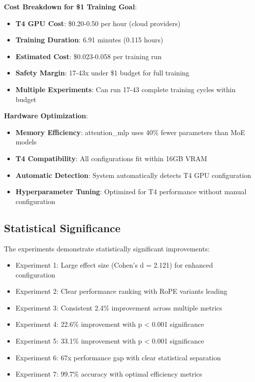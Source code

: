 \documentclass[11pt,a4paper]{article}
\begin{document}
\textbf{Cost Breakdown for \$1 Training Goal}:
\begin{itemize}
    \item \textbf{T4 GPU Cost}: \$0.20-0.50 per hour (cloud providers)
    \item \textbf{Training Duration}: 6.91 minutes (0.115 hours)
    \item \textbf{Estimated Cost}: \$0.023-0.058 per training run
    \item \textbf{Safety Margin}: 17-43x under \$1 budget for full training
    \item \textbf{Multiple Experiments}: Can run 17-43 complete training cycles within budget
\end{itemize}

\textbf{Hardware Optimization}:
\begin{itemize}
    \item \textbf{Memory Efficiency}: attention\_mlp uses 40\% fewer parameters than MoE models
    \item \textbf{T4 Compatibility}: All configurations fit within 16GB VRAM
    \item \textbf{Automatic Detection}: System automatically detects T4 GPU configuration
    \item \textbf{Hyperparameter Tuning}: Optimized for T4 performance without manual configuration
\end{itemize}

\subsection{Statistical Significance}

The experiments demonstrate statistically significant improvements:
\begin{itemize}
    \item Experiment 1: Large effect size (Cohen's d = 2.121) for enhanced configuration
    \item Experiment 2: Clear performance ranking with RoPE variants leading
    \item Experiment 3: Consistent 2.4\% improvement across multiple metrics
    \item Experiment 4: 22.6\% improvement with p < 0.001 significance
    \item Experiment 5: 33.1\% improvement with p < 0.001 significance
    \item Experiment 6: 67x performance gap with clear statistical separation
    \item Experiment 7: 99.7\% accuracy with optimal efficiency metrics
\end{itemize}
\end{document}
